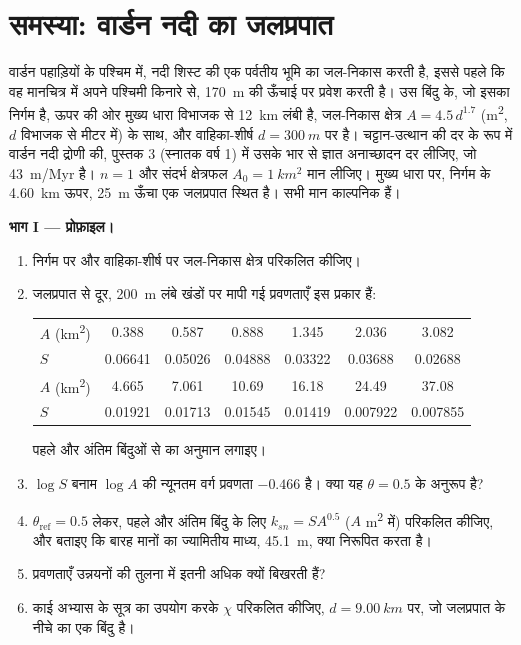 \section{समस्या: वार्डन नदी का जलप्रपात}

\begin{problem}
\label{pb:b3:quantitative-geomorphology:1}
वार्डन पहाड़ियों के पश्चिम में, नदी शिस्ट की एक पर्वतीय भूमि का जल-निकास करती है, इससे पहले कि वह
मानचित्र में अपने पश्चिमी किनारे से, \qty{170}{m} की ऊँचाई पर प्रवेश करती है। उस बिंदु के, जो इसका निर्गम है, ऊपर
की ओर मुख्य धारा विभाजक से \qty{12}{km} लंबी है,
जल-निकास क्षेत्र $A = 4.5\,d^{1.7}$ (\unit{m^2}, $d$ विभाजक से मीटर में) के साथ,
और वाहिका-शीर्ष $d = \qty{300}{m}$ पर है। चट्टान-उत्थान की दर के रूप में
वार्डन नदी द्रोणी की, पुस्तक 3 (स्नातक वर्ष 1) में उसके भार से ज्ञात अनाच्छादन दर लीजिए,
जो \qty{43}{m/Myr} है। $n = 1$ और संदर्भ क्षेत्रफल $A_0 = \qty{1}{km^2}$ मान लीजिए।
मुख्य धारा पर, निर्गम के \qty{4.60}{km} ऊपर, \qty{25}{m} ऊँचा एक जलप्रपात
स्थित है। सभी मान काल्पनिक हैं।

\medskip\noindent\textbf{भाग I --- प्रोफ़ाइल।}
\begin{enumerate}
\item निर्गम पर और वाहिका-शीर्ष पर जल-निकास क्षेत्र परिकलित कीजिए।
\item जलप्रपात से दूर, \qty{200}{m} लंबे खंडों पर मापी गई प्रवणताएँ
  इस प्रकार हैं:

  \smallskip
  {\small\begin{tabular}{l*{6}{c}}
  $A$ (\unit{km^2}) & 0.388 & 0.587 & 0.888 & 1.345 & 2.036 & 3.082 \\
  $S$ & 0.06641 & 0.05026 & 0.04888 & 0.03322 & 0.03688 & 0.02688 \\[2pt]
  $A$ (\unit{km^2}) & 4.665 & 7.061 & 10.69 & 16.18 & 24.49 & 37.08 \\
  $S$ & 0.01921 & 0.01713 & 0.01545 & 0.01419 & 0.007922 & 0.007855
  \end{tabular}}

  \smallskip
  पहले और अंतिम बिंदुओं से  का अनुमान लगाइए।
\item $\log S$ बनाम $\log A$ की न्यूनतम वर्ग प्रवणता $-0.466$ है।
  क्या यह $\theta = 0.5$ के अनुरूप है?
\item $\theta_{\mathrm{ref}} = 0.5$ लेकर, पहले और अंतिम बिंदु के लिए $k_{sn} = S A^{0.5}$ ($A$
  \unit{m^2} में) परिकलित कीजिए, और बताइए कि बारह मानों का ज्यामितीय
  माध्य, \qty{45.1}{m}, क्या निरूपित करता है।
\item प्रवणताएँ उन्नयनों की तुलना में इतनी अधिक क्यों बिखरती हैं?
\item काई अभ्यास के सूत्र का उपयोग करके $\chi$ परिकलित कीजिए, $d =
  \qty{9.00}{km}$ पर, जो जलप्रपात के नीचे का एक बिंदु है।
\end{enumerate}


\end{problem}
